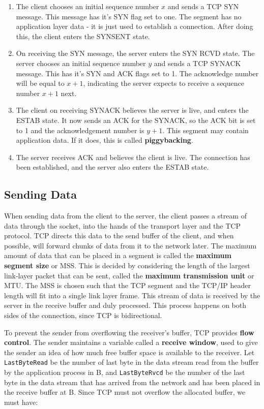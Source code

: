 \documentclass[12pt,letterpaper]{amsbook}
\theoremstyle{definition}
\begin{document}
\begin{enumerate}
  \item The client chooses an initial sequence number $x$ and sends a TCP SYN message. This message has it's SYN flag set to one. The segment has no application layer data - it is just used to establish a connection. After doing this, the client enters the SYNSENT state.
  \item On receiving the SYN message, the server enters the SYN RCVD state. The server chooses an initial sequence number $y$ and sends a TCP SYNACK message. This has it's SYN and ACK flags set to 1. The acknowledge number will be equal to $x+1$, indicating the server expects to receive a sequence number $x+1$ next.
  \item The client on receiving SYNACK believes the server is live, and enters the ESTAB state. It now sends an ACK for the SYNACK, so the ACK bit is set to 1 and the acknowledgement number is $y+1$. This segment may contain application data. If it does, this is called \textbf{piggybacking}.
  \item The server receives ACK and believes the client is live. The connection has been established, and the server also enters the ESTAB state.
\end{enumerate}

\subsection{Sending Data}

When sending data from the client to the server, the client passes a stream of data through the socket, into the hands of the transport layer and the TCP protocol. TCP directs this data to the send buffer of the client, and when possible, will forward chunks of data from it to the network later. The maximum amount of data that can be placed in a segment is called the \textbf{maximum segment size} or MSS. This is decided by considering the length of the largest link-layer packet that can be sent, called the \textbf{maximum transmission unit} or MTU. The MSS is chosen such that the TCP segment and the TCP/IP header length will fit into a single link layer frame. This stream of data is received by the server in the receive buffer and duly processed. This process happens on both sides of the connection, since TCP is bidirectional.

To prevent the sender from overflowing the receiver's buffer, TCP provides \textbf{flow control}. The sender maintains a variable called a \textbf{receive window}, used to give the sender an idea of how much free buffer space is available to the receiver. Let \texttt{LastByteRead} be the number of last byte in the data stream read from the buffer by the application process in B, and \texttt{LastByteRvcd} be the number of the last byte in the data stream that has arrived from the network and has been placed in the receive buffer at B. Since TCP must not overflow the allocated buffer, we must have:
\end{document}
